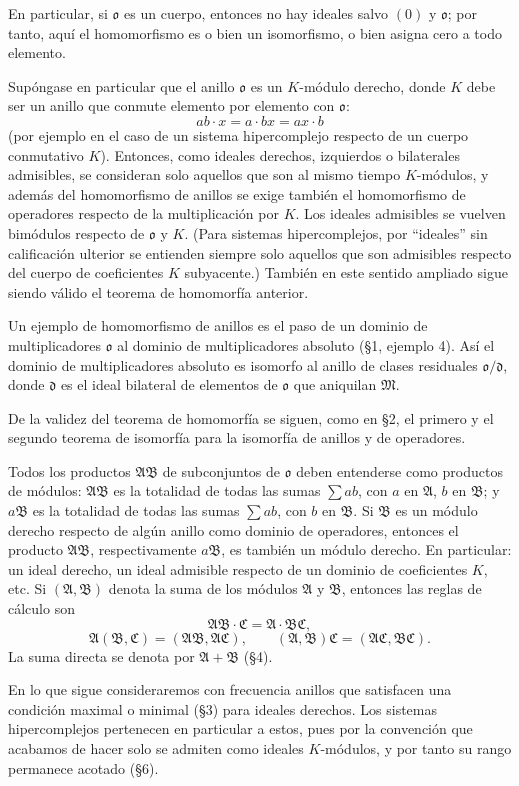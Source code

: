 \documentclass[11pt]{article}
\providecommand{\mA}{\mathfrak{A}}
\providecommand{\mB}{\mathfrak{B}}
\providecommand{\mC}{\mathfrak{C}}
\providecommand{\mM}{\mathfrak{M}}
\providecommand{\mo}{\mathfrak{o}}
\providecommand{\md}{\mathfrak{d}}
\begin{document}
En particular, si $\mo$ es un cuerpo, entonces no hay ideales salvo $(0)$ y $\mo$; por tanto, aquí el homomorfismo es o bien un isomorfismo, o bien asigna cero a todo elemento.

Supóngase en particular que el anillo $\mo$ es un $K$-módulo derecho, donde $K$ debe ser un anillo que conmute elemento por elemento con $\mo$:
\[
        ab\cdot x=a\cdot bx=ax\cdot b
\]
(por ejemplo en el caso de un sistema hipercomplejo respecto de un cuerpo conmutativo $K$). Entonces, como ideales derechos, izquierdos o bilaterales admisibles, se consideran solo aquellos que son al mismo tiempo $K$-módulos, y además del homomorfismo de anillos se exige también el homomorfismo de operadores respecto de la multiplicación por $K$. Los ideales admisibles se vuelven bimódulos respecto de $\mo$ y $K$. (Para sistemas hipercomplejos, por ``ideales'' sin calificación ulterior se entienden siempre solo aquellos que son admisibles respecto del cuerpo de coeficientes $K$ subyacente.) También en este sentido ampliado sigue siendo válido el teorema de homomorfía anterior.

Un ejemplo de homomorfismo de anillos es el paso de un dominio de multiplicadores $\mo$ al dominio de multiplicadores absoluto (§1, ejemplo 4). Así el dominio de multiplicadores absoluto es isomorfo al anillo de clases residuales $\mo/\md$, donde $\md$ es el ideal bilateral de elementos de $\mo$ que aniquilan $\mM$.

De la validez del teorema de homomorfía se siguen, como en §2, el primero y el segundo teorema de isomorfía para la isomorfía de anillos y de operadores.

Todos los productos $\mA\mB$ de subconjuntos de $\mo$ deben entenderse como productos de módulos: $\mA\mB$ es la totalidad de todas las sumas $\sum ab$, con $a$ en $\mA$, $b$ en $\mB$; y $a\mB$ es la totalidad de todas las sumas $\sum ab$, con $b$ en $\mB$. Si $\mB$ es un módulo derecho respecto de algún anillo como dominio de operadores, entonces el producto $\mA\mB$, respectivamente $a\mB$, es también un módulo derecho. En particular: un ideal derecho, un ideal admisible respecto de un dominio de coeficientes $K$, etc. Si $(\mA,\mB)$ denota la suma de los módulos $\mA$ y $\mB$, entonces las reglas de cálculo son
\[
        \mA\mB\cdot\mC=\mA\cdot\mB\mC,
\]
\[
        \mA(\mB,\mC)=(\mA\mB,\mA\mC),
        \qquad
        (\mA,\mB)\mC=(\mA\mC,\mB\mC).
\]
La suma directa se denota por $\mA+\mB$ (§4).

En lo que sigue consideraremos con frecuencia anillos que satisfacen una condición maximal o minimal (§3) para ideales derechos. Los sistemas hipercomplejos pertenecen en particular a estos, pues por la convención que acabamos de hacer solo se admiten como ideales $K$-módulos, y por tanto su rango permanece acotado (§6).
\end{document}

